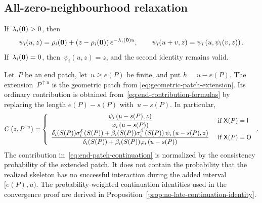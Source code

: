 \subsection{All-zero-neighbourhood relaxation}
\label{app:positivity-algebra}

If~$\lambda_i(\mathbf{0})>0$, then
\begin{equation}
\label{eq:all-zero-neighbourhood-relaxation}
\psi_i(u,z)
=
\rho_i(\mathbf{0})
+
\left(z-\rho_i(\mathbf{0})\right)e^{-\lambda_i(\mathbf{0})u},
\qquad
\psi_i(u+v,z)
=
\psi_i\left(u,\psi_i(v,z)\right).
\end{equation}
If~$\lambda_i(\mathbf{0})=0$, then~$\psi_i(u,z)=z$, and the second identity remains
valid.

Let~$P$ be an end patch, let~$u\geq e(P)$ be finite, and put
$h=u-e(P)$. The extension~$P^{\uparrow u}$ is the geometric patch from
\eqref{eq:geometric-patch-extension}. Its ordinary contribution is obtained
from~\eqref{eq:end-contribution-formulas} by replacing the length
$e(P)-s(P)$ with~$u-s(P)$. In particular,
\begin{equation}
\label{eq:end-patch-continuation}
C\left(z,P^{\uparrow u}\right)
=
\left\{\begin{array}{cl} 
\displaystyle
\frac{\psi_i\left(u-s(P),z\right)}{\varphi_i\left(u-s(P)\right)}
 &\text{ if } \mathsf X(P)=\mathsf I \\ 
\displaystyle
\frac{
\delta_i(S(P))\sigma_i^\delta\left(S(P)\right)
+
\beta_i(S(P))\sigma_i^\beta\left(S(P)\right)
\psi_i\left(u-s(P),z\right)
}{
\delta_i(S(P))+\beta_i(S(P))\varphi_i\left(u-s(P)\right)
}
 &\text{ if } \mathsf X(P)=\mathsf O \end{array}\right..
\end{equation}
The contribution in~\eqref{eq:end-patch-continuation} is normalized by the
consistency probability of the extended patch. It does not contain the
probability that the realized skeleton has no successful interaction during
the added interval~$[e(P),u)$. The probability-weighted continuation identities
used in the convergence proof are derived in
Proposition~\ref{prop:no-late-continuation-identity}.
